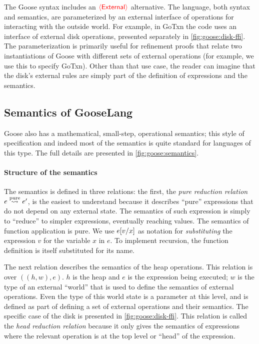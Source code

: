 The Goose syntax includes an $\external$ alternative. The language, both syntax
and semantics, are parameterized by an external interface of operations for
interacting with the outside world. For example, in GoTxn the code uses an
interface of external disk operations, presented separately in
\cref{fig:goose:disk-ffi}. The parameterization is primarily useful for
refinement proofs that relate two instantiations of Goose with different sets of external operations (for example, we use this to specify GoTxn). Other than that use case,
the reader can imagine that the disk's external rules are simply part of the definition
of expressions and the semantics.

\subsection{Semantics of GooseLang}%
\label{sec:goose:semantics}

Goose also has a mathematical, small-step, operational semantics; this style of
specification and indeed most of the semantics is quite standard for languages of
this type. The full details are presented in \cref{fig:goose:semantics}.



\paragraph{Structure of the semantics}
The semantics is defined in three relations: the first, the
\emph{pure reduction relation} $e \purereduction e'$, is the easiest to understand
because it describes ``pure'' expressions that do not depend on any external
state. The semantics of such expression is simply to ``reduce'' to simpler
expressions, eventually reaching values. The semantics of function application
is pure. We use $\subst{e}{x}{v}$ as notation for \emph{substituting} the expression
$v$ for the variable $x$ in $e$. To implement recursion, the function definition
is itself substituted for its name.

The next relation describes the semantics of the heap operations. This relation is over
$((h, w), e)$. $h$ is the heap and $e$ is the expression being executed; $w$ is
the type of an external ``world'' that is used to define the semantics of
external operations. Even the type of this world state is a parameter at this
level, and is defined as part of defining a set of external operations and their
semantics. The specific case of the disk is presented in
\cref{fig:goose:disk-ffi}. This
relation is called the \emph{head reduction
relation} because it only gives the semantics of expressions where the
relevant operation is at the top level or ``head'' of the expression.

